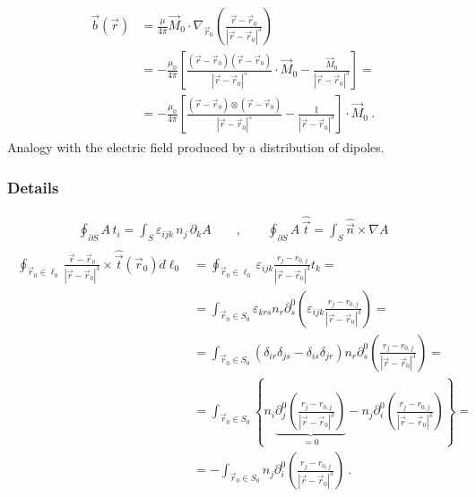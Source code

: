 \documentclass[letterpaper,10pt,english]{jupyterBook}
\begin{document}
\begin{equation*}
\begin{split}\begin{aligned}
 \vec{b}(\vec{r})
  & = \frac{\mu}{4 \pi} \vec{M}_0 \cdot \nabla_{\vec{r}_0} \left( \frac{\vec{r} - \vec{r}_0}{|\vec{r} - \vec{r}_0|^3} \right) \\
  & = - \frac{\mu_0}{4\pi} \left[ \frac{(\vec{r}-\vec{r}_0)(\vec{r}-\vec{r}_0)}{|\vec{r}-\vec{r}_0|^5} \cdot \vec{M}_0 - \frac{\vec{M}_0}{|\vec{r}-\vec{r}_0|^3} \right] = \\
  & = - \frac{\mu_0}{4\pi} \left[ \frac{(\vec{r}-\vec{r}_0) \otimes (\vec{r}-\vec{r}_0)}{|\vec{r}-\vec{r}_0|^5} - \frac{\mathbb{I}}{|\vec{r}-\vec{r}_0|^3} \right] \cdot \vec{M}_0 \ .
\end{aligned}\end{split}
\end{equation*}
\sphinxAtStartPar
{} Analogy with the electric field produced by a distribution of dipoles.
\subsubsection*{Details}
\begin{equation*}
\begin{split}\oint_{\partial S} A \, t_i = \int_S \varepsilon_{ijk} \, n_j \, \partial_k A
\qquad , \qquad
  \oint_{\partial S} A \, \hat{\vec{t}} = \int_S \hat{\vec{n}} \times \nabla A\end{split}
\end{equation*}\begin{equation*}
\begin{split}\begin{aligned}
\oint_{\vec{r}_0 \in \ell_0} \frac{\vec{r} - \vec{r}_0}{|\vec{r} - \vec{r}_0|^3} \times \hat{\vec{t}}(\vec{r}_0) d \ell_0
  & = \oint_{\vec{r}_0 \in \ell_0} \varepsilon_{ijk} \frac{r_j - r_{0,j}}{|\vec{r} - \vec{r}_0|^3}  t_k = \\
  & = \int_{\vec{r}_0 \in S_0} \varepsilon_{krs} n_r \partial^0_s \left( \varepsilon_{ijk} \frac{r_j - r_{0,j}}{|\vec{r} - \vec{r}_0|^3} \right) = \\
  & = \int_{\vec{r}_0 \in S_0} \left( \delta_{ir} \delta_{js} - \delta_{is} \delta_{jr} \right) n_r \partial^0_s \left( \frac{r_j - r_{0,j}}{|\vec{r} - \vec{r}_0|^3} \right) = \\
  & = \int_{\vec{r}_0 \in S_0} \left\{ n_i \underbrace{\partial^0_j \left( \frac{r_j - r_{0,j}}{|\vec{r} - \vec{r}_0|^3} \right)}_{=0} - n_j \partial^0_i \left( \frac{r_j - r_{0,j}}{|\vec{r} - \vec{r}_0|^3} \right) \right\} = \\
  & = - \int_{\vec{r}_0 \in S_0} n_j \partial^0_i \left( \frac{r_j - r_{0,j}}{|\vec{r} - \vec{r}_0|^3} \right) \ .
\end{aligned}\end{split}
\end{equation*}
\end{document}
